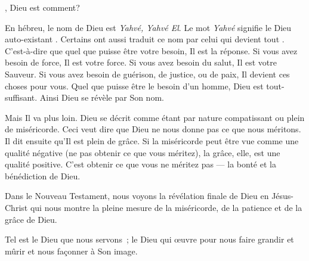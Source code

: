 \dvrule






, Dieu est comment?

En hébreu, le nom de Dieu est \emph{Yahvé, Yahvé El}.
 Le mot \emph{Yahvé} signifie le \og Dieu auto-existant \fg{}.
 Certains ont aussi traduit ce nom par \og celui qui devient tout \fg{}.
 C'est-à-dire que quel que puisse être votre besoin, Il est la réponse.
 Si vous avez besoin de force, Il est votre force.
 Si vous avez besoin du salut, Il est votre Sauveur.
 Si vous avez besoin de guérison, de justice, ou de paix,
 Il devient ces choses pour vous.
 Quel que puisse être le besoin d'un homme, Dieu est tout-suffisant.
 Ainsi Dieu se révèle par Son nom.

Mais Il va plus loin. Dieu se décrit comme étant par nature compatissant
 ou plein de miséricorde. Ceci veut dire que Dieu ne nous donne pas
 ce que nous méritons.
 Il dit ensuite qu'Il est plein de grâce.
 Si la miséricorde peut être vue comme une qualité négative
 (ne pas obtenir ce que vous méritez), la grâce, elle, est une qualité positive.
 C'est obtenir ce que vous ne méritez pas
 --- la bonté et la bénédiction de Dieu.


Dans le Nouveau Testament, nous voyons la révélation finale de Dieu
 en Jésus-Christ qui nous montre la pleine mesure de la miséricorde,
 de la patience et de la grâce de Dieu.

Tel est le Dieu que nous servons~; le Dieu qui œuvre pour nous faire grandir
 et mûrir et nous façonner à Son image. 

\dvrule




